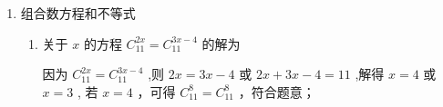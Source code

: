 \begin{enumerate}
\begin{enumerate}
        \item 已知 $m,n,k \in  {{N}}^{ * },m \geq  k \geq  n$ .
        \begin{enumerate}
            \item 证明: ${{C}}_{m}^{k}{{C}}_{m - k}^{n} = {{C}}_{m}^{n}{{C}}_{m - n}^{k}$
            \item 证明: ${{C}}_{m}^{k}{{C}}_{k}^{n} = {{C}}_{m}^{n}{{C}}_{m - n}^{k - n}$
        \end{enumerate}
        \begin{jieda}
            \begin{enumerate}
                \item 因为 ${{C}}_{m}^{k}{{C}}_{m - k}^{n} = \dfrac{m!}{k!\left( {m - k}\right) !} \cdot  \dfrac{\left( {m - k}\right) !}{n!\left( {m - k - n}\right) !} = \dfrac{m!}{k!n!\left( {m - n - k}\right) !}$ ，
                
                ${{C}}_{m}^{n}{{C}}_{m - n}^{k} = \dfrac{m!}{n!\left( {m - n}\right) !} \cdot  \dfrac{\left( {m - n}\right) !}{k!\left( {m - n - k}\right) !} = \dfrac{m!}{k!n!\left( {m - n - k}\right) !}$
                
                所以 ${{C}}_{m}^{k}{{C}}_{m - k}^{n} = {{C}}_{m}^{n}{{C}}_{m - n}^{k}$ ;
                
                \item 因为 ${{C}}_{m}^{k}{{C}}_{k}^{n} = \dfrac{m!}{k!\left( {m - k}\right) !} \cdot  \dfrac{k!}{n!\left( {k - n}\right) !} = \dfrac{m!}{n!\left( {m - k}\right) !\left( {k - n}\right) !}$ ，
                
                ${{C}}_{m}^{n}{{C}}_{m - n}^{k - n} = \dfrac{m!}{n!\left( {m - n}\right) !} \cdot  \dfrac{\left( {m - n}\right) !}{\left( {k - n}\right) !\left( {m - k}\right) !} = \dfrac{m!}{n!\left( {m - k}\right) !\left( {k - n}\right) !}$
                
                所以 ${{C}}_{m}^{k}{{C}}_{k}^{n} = {{C}}_{m}^{n}{{C}}_{m - n}^{k - n}$ .
            \end{enumerate}
        \end{jieda}
    \end{enumerate}
    \item 组合数方程和不等式
    \begin{enumerate}
        \item 关于 $x$ 的方程 ${{C}}_{11}^{2x} = {{C}}_{11}^{{3x} - 4}$ 的解为 
        \begin{jieda}
            因为 ${{C}}_{11}^{2x} = {{C}}_{11}^{{3x} - 4}$ ,则 ${2x} = {3x} - 4$ 或 ${2x} + {3x} - 4 = {11}$ ,解得 $x = 4$ 或 $x = 3$ , 若 $x = 4$ ，可得 ${{C}}_{11}^{8} = {{C}}_{11}^{8}$ ，符合题意；
            

\end{jieda}
\end{enumerate}
\end{enumerate}
